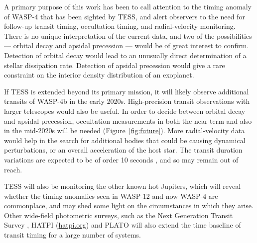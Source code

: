 \documentclass[12pt,twocolumn,tighten]{aastex62}
\begin{document}
A primary purpose of this work has been to call attention to the
timing anomaly of WASP-4 that has been sighted by TESS, and alert
observers to the need for follow-up transit timing, occultation
timing, and radial-velocity monitoring.  There is no unique
interpretation of the current data, and two of the possibilities ---
orbital decay and apsidal precession --- would be of great interest to
confirm. Detection of orbital decay would lead to an unusually direct
determination of a stellar dissipation rate. Detection of apsidal
precession would give a rare constraint on the interior density
distribution of an exoplanet.

If TESS is extended beyond its primary mission, it will likely observe
additional transits of WASP-4b in the early 2020s.
High-precision transit observations with
larger telescopes would also be useful.  In order to decide between
orbital decay and apsidal precession, occultation measurements in both
the near term and also in the mid-2020s will be needed 
(Figure~\ref{fig:future}).  More
radial-velocity data would help in the search for additional bodies
that could be causing dynamical perturbations, or an overall
acceleration of the host star.  The transit duration variations are
expected to be of order 10 seconds \citep{pal_periastron_2008}, and so
may remain out of reach.

TESS will also be monitoring the other known hot Jupiters, which will
reveal whether the timing anomalies seen in WASP-12 and now WASP-4 are
commonplace, and may shed some light on the circumstances in which
they arise. Other wide-field photometric surveys, such as the Next
Generation Transit Survey \citep{wheatley_next_2018}, HATPI
(\href{https://hatpi.org}{hatpi.org}) and PLATO
\citep{rauer_plato_2014} will also extend the time baseline of transit
timing for a large number of systems.
\end{document}
